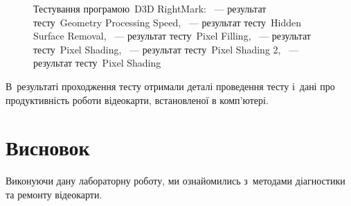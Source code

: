 \documentclass[
	a4paper,
	oneside,
	BCOR = 10mm,
	DIV = 12,
	12pt,
	headings = normal,
]{scrartcl}
\begin{document}
\begin{figure}[!htbp]
\begin{subfigure}[t]{\columnwidth / 2}
					\caption{}
					\label{subfig:d3drightmark-pxshading-03-res}
				\end{subfigure}
				\caption{Тестування програмою~\textenglish{D3D RightMark}: ~— результат тесту~\textenglish{Geometry Processing Speed}, ~— результат тесту~\textenglish{Hidden Surface Removal}, ~— результат тесту~\textenglish{Pixel Filling}, ~— результат тесту~\textenglish{Pixel Shading}, ~— результат тесту~\textenglish{Pixel Shading 2}, ~— результат тесту~\textenglish{Pixel Shading}}
				\label{fig:d3drightmark}
			\end{figure}

			В~результаті проходження тесту отримали деталі проведення тесту і~дані про продуктивність роботи відеокарти, встановленої в комп'ютері.


	\section{Висновок}
		Виконуючи дану лабораторну роботу, ми ознайомились з~методами діагностики та ремонту відеокарти.
\end{document}
